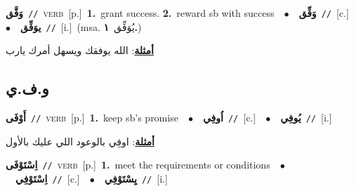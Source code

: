 \documentclass[10pt,a4paper,twoside]{article} %
\begin{document}
\begin{multicols}{2}
{\setlength\topsep{0pt}\textbf{\foreignlanguage{arabic}{وَفَّق}}\ {\color{gray}\texttt{//}\color{black}}\ \textsc{verb}\ [p.]\ \textbf{1.}~grant success.  \textbf{2.}~reward sb with success\ \ $\bullet$\ \ \setlength\topsep{0pt}\textbf{\foreignlanguage{arabic}{وَفِّق}}\ {\color{gray}\texttt{//}\color{black}}\ [c.]\ \ $\bullet$\ \ \setlength\topsep{0pt}\textbf{\foreignlanguage{arabic}{يوَفِّق}}\ {\color{gray}\texttt{//}\color{black}}\ [i.]\ \color{gray}(msa. \foreignlanguage{arabic}{يُوَفِّق}~\foreignlanguage{arabic}{\textbf{١.}})\color{black}\  \begin{flushright}\color{gray}\foreignlanguage{arabic}{\textbf{\underline{\foreignlanguage{arabic}{أمثلة}}}: الله يوفقك ويسهل أمرك يارب}\end{flushright}\color{black}} \vspace{2mm}

\vspace{-3mm}
\subsection*{\color{blue}\foreignlanguage{arabic}{و.ف.ي}\color{blue}{}} 

{\setlength\topsep{0pt}\textbf{\foreignlanguage{arabic}{أَوْفَى}}\ {\color{gray}\texttt{//}\color{black}}\ \textsc{verb}\ [p.]\ \textbf{1.}~keep sb's promise\ \ $\bullet$\ \ \setlength\topsep{0pt}\textbf{\foreignlanguage{arabic}{اُوفِي}}\ {\color{gray}\texttt{//}\color{black}}\ [c.]\ \ $\bullet$\ \ \setlength\topsep{0pt}\textbf{\foreignlanguage{arabic}{يُوفِي}}\ {\color{gray}\texttt{//}\color{black}}\ [i.]\  \begin{flushright}\color{gray}\foreignlanguage{arabic}{\textbf{\underline{\foreignlanguage{arabic}{أمثلة}}}: اوفِي بالوعود اللي عليك بالأول}\end{flushright}\color{black}} \vspace{2mm}

{\setlength\topsep{0pt}\textbf{\foreignlanguage{arabic}{اِسْتَوْفَى}}\ {\color{gray}\texttt{//}\color{black}}\ \textsc{verb}\ [p.]\ \textbf{1.}~meet the requirements or conditions\ \ $\bullet$\ \ \setlength\topsep{0pt}\textbf{\foreignlanguage{arabic}{اِسْتَوْفِي}}\ {\color{gray}\texttt{//}\color{black}}\ [c.]\ \ $\bullet$\ \ \setlength\topsep{0pt}\textbf{\foreignlanguage{arabic}{يِسْتَوْفِي}}\ {\color{gray}\texttt{//}\color{black}}\ [i.]\ } \vspace{2mm}


\end{multicols}
\end{document}
